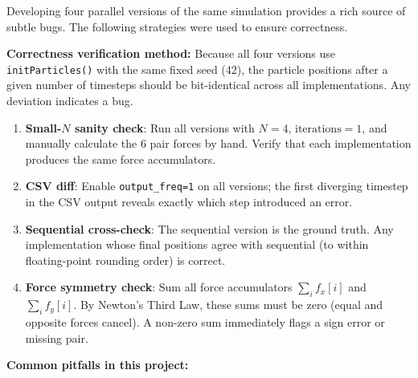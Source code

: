 ﻿\documentclass[12pt,a4paper]{article}
\begin{document}
Developing four parallel versions of the same simulation provides a rich
source of subtle bugs. The following strategies were used to ensure
correctness.

\textbf{Correctness verification method:}
Because all four versions use \texttt{initParticles()} with the same fixed
seed (42), the particle positions after a given number of timesteps should
be bit-identical across all implementations. Any deviation indicates a bug.

\begin{enumerate}
    \item \textbf{Small-$N$ sanity check}: Run all versions with $N=4$,
          $\text{iterations}=1$, and manually calculate the 6 pair forces
          by hand. Verify that each implementation produces the same force
          accumulators.
    \item \textbf{CSV diff}: Enable \texttt{output\_freq=1} on all versions;
          the first diverging timestep in the CSV output reveals exactly
          which step introduced an error.
    \item \textbf{Sequential cross-check}: The sequential version is the
          ground truth. Any implementation whose final positions agree with
          sequential (to within floating-point rounding order) is correct.
    \item \textbf{Force symmetry check}: Sum all force accumulators
          $\sum_i f_x[i]$ and $\sum_i f_y[i]$. By Newton's Third Law,
          these sums must be zero (equal and opposite forces cancel).
          A non-zero sum immediately flags a sign error or missing pair.
\end{enumerate}

\textbf{Common pitfalls in this project:}
\end{document}
